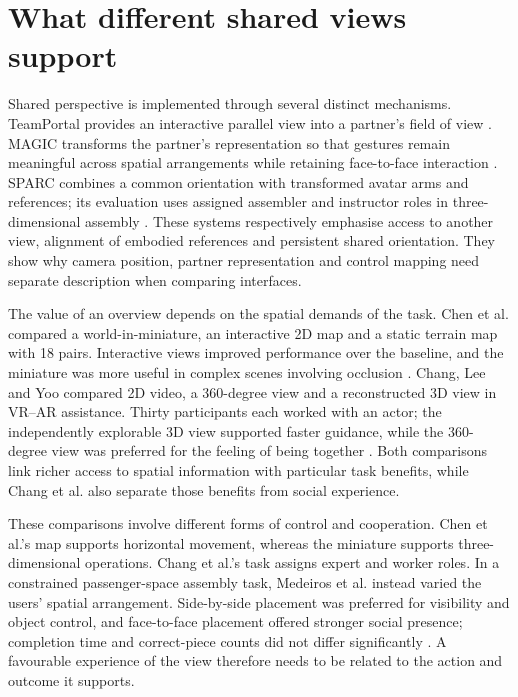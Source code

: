 \section{What different shared views support}\label{sec:2-2}

Shared perspective is implemented through several distinct mechanisms. TeamPortal provides an interactive parallel view into a partner's field of view \cite{wang2025}. MAGIC transforms the partner's representation so that gestures remain meaningful across spatial arrangements while retaining face-to-face interaction \cite{fidalgo2023}. SPARC combines a common orientation with transformed avatar arms and references; its evaluation uses assigned assembler and instructor roles in three-dimensional assembly \cite{simoes2025}. These systems respectively emphasise access to another view, alignment of embodied references and persistent shared orientation. They show why camera position, partner representation and control mapping need separate description when comparing interfaces.

The value of an overview depends on the spatial demands of the task. Chen et al. compared a world-in-miniature, an interactive 2D map and a static terrain map with 18 pairs. Interactive views improved performance over the baseline, and the miniature was more useful in complex scenes involving occlusion \cite{chen2024}. Chang, Lee and Yoo compared 2D video, a 360-degree view and a reconstructed 3D view in VR--AR assistance. Thirty participants each worked with an actor; the independently explorable 3D view supported faster guidance, while the 360-degree view was preferred for the feeling of being together \cite{chang2024}. Both comparisons link richer access to spatial information with particular task benefits, while Chang et al. also separate those benefits from social experience.

These comparisons involve different forms of control and cooperation. Chen et al.'s map supports horizontal movement, whereas the miniature supports three-dimensional operations. Chang et al.'s task assigns expert and worker roles. In a constrained passenger-space assembly task, Medeiros et al. instead varied the users' spatial arrangement. Side-by-side placement was preferred for visibility and object control, and face-to-face placement offered stronger social presence; completion time and correct-piece counts did not differ significantly \cite{medeiros2024}. A favourable experience of the view therefore needs to be related to the action and outcome it supports.

